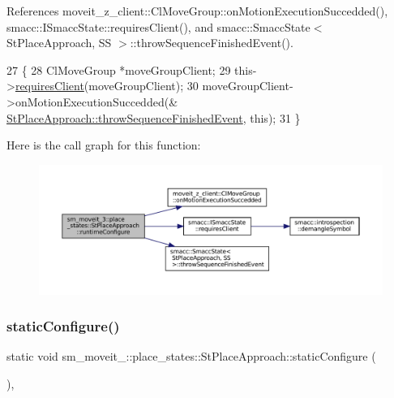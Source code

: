 References moveit\+\_\+z\+\_\+client\+::\+Cl\+Move\+Group\+::on\+Motion\+Execution\+Succedded(), smacc\+::\+I\+Smacc\+State\+::requires\+Client(), and smacc\+::\+Smacc\+State$<$ St\+Place\+Approach, S\+S $>$\+::throw\+Sequence\+Finished\+Event().


\begin{DoxyCode}
27     \{
28         ClMoveGroup *moveGroupClient;
29         this->\hyperlink{classsmacc_1_1ISmaccState_a7f95c9f0a6ea2d6f18d1aec0519de4ac}{requiresClient}(moveGroupClient);
30         moveGroupClient->onMotionExecutionSuccedded(&
      \hyperlink{classsmacc_1_1SmaccState_a49dcfc25824f7e083dd4b999c49ab2b6}{StPlaceApproach::throwSequenceFinishedEvent}, \textcolor{keyword}{this});
31     \}
\end{DoxyCode}
Here is the call graph for this function\+:
\nopagebreak
\begin{figure}[H]
\begin{center}
\leavevmode
\includegraphics[width=350pt]{structsm__moveit__3_1_1place__states_1_1StPlaceApproach_aa0001a28f21038a8bc2f99f3a9c49b62_cgraph}
\end{center}
\end{figure}
\mbox{\label{structsm__moveit__3_1_1place__states_1_1StPlaceApproach_a1d71df8302e7961c652fa3b5a1e08452}} 
\subsubsection{\texorpdfstring{static\+Configure()}{staticConfigure()}}
{\footnotesize\ttfamily static void sm\+\_\+moveit\+\_\+::place\+\_\+states\+::\+St\+Place\+Approach\+::static\+Configure (\begin{DoxyParamCaption}{ }\end{DoxyParamCaption})\hspace{0.3cm}{\ttfamily [inline]}, {\ttfamily [static]}}



